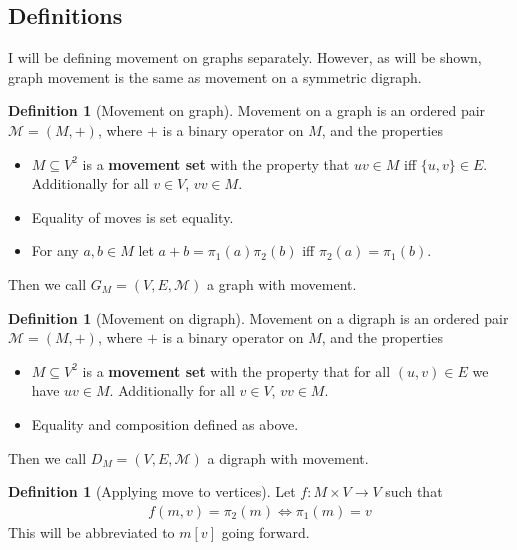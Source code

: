\documentclass{article}
\theoremstyle{plain}
\theoremstyle{definition}
\newtheorem{definition}[theorem]{Definition}
\begin{document}
\subsection{Definitions}
I will be defining movement on graphs separately. However, as will be
shown, graph movement is the same as movement on a symmetric digraph.
\begin{definition}[Movement on graph]\label{def graph movement}
	Movement on a graph is an ordered pair $\mathcal{M} = (M,+)$,
	where $+$ is a binary operator on $M$, and the properties
	\begin{itemize}
		\item $M \subseteq V^2$ is a \textbf{movement set} with the 
			property that $uv \in M$ iff $\{u,v\} \in E$. Additionally 
			for all $v \in V$, $vv\in M$.
		\item Equality of moves is set equality.
		\item For any $a,b\in M$ let $a+b = \pi_1(a)\pi_2(b)$ iff
			$\pi_2(a) = \pi_1(b)$.
	\end{itemize}
	Then we call $G_M=(V,E,\mathcal{M})$ a graph with movement.
\end{definition}
\begin{definition}[Movement on digraph]\label{def digraph movement}
	Movement on a digraph is an ordered pair $\mathcal{M} = (M,+)$,
	where $+$ is a binary operator on $M$, and the properties
	\begin{itemize}
		\item $M \subseteq V^2$ is a \textbf{movement set} with the 
			property that for all $(u,v) \in E$ we have $uv
			\in M$. Additionally for all $v \in V$, $vv\in M$.
		\item Equality and composition defined as above.
	\end{itemize}
	Then we call $D_M=(V,E,\mathcal{M})$ a digraph with movement.
\end{definition}
\begin{definition}[Applying move to vertices]\label{def apply movement}
	Let $f: M \times V \rightarrow V$ such that 
	\begin{equation}
	\begin{aligned}
		f(m,v) = \pi_2(m) \Leftrightarrow \pi_1(m) = v
	\end{aligned}
	\end{equation}
	This will be abbreviated to $m[v]$ going forward.
\end{definition}
\newpage
\end{document}

